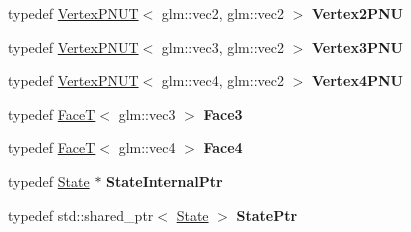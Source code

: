 \begin{DoxyCompactItemize}
\item 
\hypertarget{namespaces9_ab5a9c090c1e3fd178d6f09a83c811ff4}{typedef \hyperlink{structs9_1_1VertexPNUT}{\-Vertex\-P\-N\-U\-T}$<$ glm\-::vec2, \*
glm\-::vec2 $>$ {\bfseries \-Vertex2\-P\-N\-U}}\label{namespaces9_ab5a9c090c1e3fd178d6f09a83c811ff4}

\item 
\hypertarget{namespaces9_a6f3356fbc3161269963998a8016353df}{typedef \hyperlink{structs9_1_1VertexPNUT}{\-Vertex\-P\-N\-U\-T}$<$ glm\-::vec3, \*
glm\-::vec2 $>$ {\bfseries \-Vertex3\-P\-N\-U}}\label{namespaces9_a6f3356fbc3161269963998a8016353df}

\item 
\hypertarget{namespaces9_a151a22b38cb7288bbc5c61f3e8ff74b5}{typedef \hyperlink{structs9_1_1VertexPNUT}{\-Vertex\-P\-N\-U\-T}$<$ glm\-::vec4, \*
glm\-::vec2 $>$ {\bfseries \-Vertex4\-P\-N\-U}}\label{namespaces9_a151a22b38cb7288bbc5c61f3e8ff74b5}

\item 
\hypertarget{namespaces9_a9c60e164ad51e9ec83e2859caad3a75e}{typedef \hyperlink{structs9_1_1FaceT}{\-Face\-T}$<$ glm\-::vec3 $>$ {\bfseries \-Face3}}\label{namespaces9_a9c60e164ad51e9ec83e2859caad3a75e}

\item 
\hypertarget{namespaces9_ac92f5920c4e35bc4298ed5f0874cdd3e}{typedef \hyperlink{structs9_1_1FaceT}{\-Face\-T}$<$ glm\-::vec4 $>$ {\bfseries \-Face4}}\label{namespaces9_ac92f5920c4e35bc4298ed5f0874cdd3e}

\item 
\hypertarget{namespaces9_a0fc41616c998e93ef3bf9ba690b7433f}{typedef \hyperlink{classs9_1_1State}{\-State} $\ast$ {\bfseries \-State\-Internal\-Ptr}}\label{namespaces9_a0fc41616c998e93ef3bf9ba690b7433f}

\item 
\hypertarget{namespaces9_ac9ab56b7fa41e5d9da243b098dd8d51c}{typedef std\-::shared\-\_\-ptr$<$ \hyperlink{classs9_1_1State}{\-State} $>$ {\bfseries \-State\-Ptr}}\label{namespaces9_ac9ab56b7fa41e5d9da243b098dd8d51c}

\end{DoxyCompactItemize}
